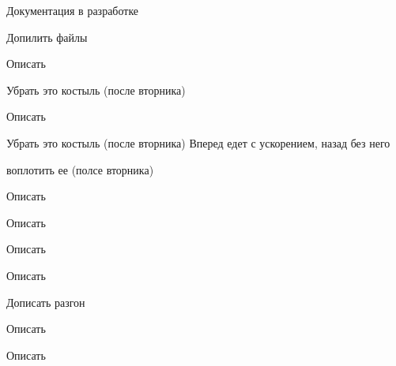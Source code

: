 \begin{DoxyRefList}
Документация в разработке  
\item[Файл \mbox{\hyperlink{file_8h}{file.h}} ]\label{todo__todo000020}%
%
Допилить файлы  
\item[Член \mbox{\hyperlink{constants_8h_aa0a833c32f26b4b74e3d97bdd2de3d7f}{grey}} ]\label{todo__todo000008}%
%
Описать  
\item[Член \mbox{\hyperlink{group__line_gaa1ef32768cc6e595d0a6b1b93198ad43}{line}} (int speed, int dist, int type)]\label{todo__todo000021}%
%
Убрать это костыль (после вторника)  
\item[Член \mbox{\hyperlink{constants_8h_a73983aa2c834511f4c2ffd91f352d548}{maxv}} ]\label{todo__todo000001}%
%
Описать  
\item[Член \mbox{\hyperlink{group__motors_ga7c52089e1da288007eb28bfe32479c29}{move\+BC}} (int s, int dist, bool stop=true)]\label{todo__todo000023}%
%
Убрать это костыль (после вторника) Вперед едет с ускорением, назад без него  
\item[Член \mbox{\hyperlink{group__motors_ga2789eedb3418d0a45362184e07127b5d}{move\+BCNEW}} (\mbox{\hyperlink{struct_speed}{Speed}} p, int dist, bool stop=true)]\label{todo__todo000022}%
%
воплотить ее (полсе вторника)  
\item[Член \mbox{\hyperlink{constants_8h_a53c812e1752f65cd9e7e244a1281f71c}{ndir}} ]\label{todo__todo000015}%
%
Описать  
\item[Член \mbox{\hyperlink{constants_8h_a9a035c2eeb554f161459002ebe2ebd4c}{Pr}} ]\label{todo__todo000007}%
%
Описать  
\item[Член \mbox{\hyperlink{constants_8h_a08f502751d90ac21500d073f5b0ae339}{speed}} ]\label{todo__todo000016}%
%
Описать  
\item[Член \mbox{\hyperlink{constants_8h_ab6e68cdfe1ce8068913bec4829a7fe5e}{speedD}} ]\label{todo__todo000017}%
%
Описать  
\item[Группа \mbox{\hyperlink{group__turn}{turn}} ]\label{todo__todo000024}%
%
Дописать разгон  
\item[Член \mbox{\hyperlink{constants_8h_a2cded47d446b43f4d3f07481e46061ff}{turn1wheel}} ]\label{todo__todo000014}%
%
Описать  
\item[Член \mbox{\hyperlink{constants_8h_aeea7cc731ef02ac1e2b1a5df4418d917}{ver}} ]\label{todo__todo000003}%
%
Описать 
\end{DoxyRefList}